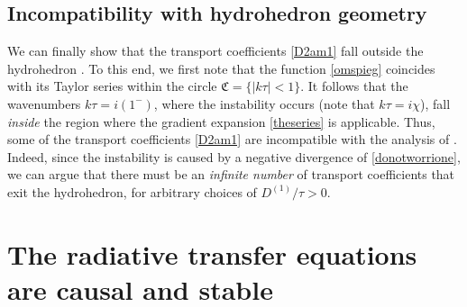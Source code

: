 \documentclass[a4paper, amsfonts, amssymb, amsmath, reprint, showkeys, nofootinbib, twoside,notitlepage,onecolumn]{revtex4-2}
\theoremstyle{definition}
\theoremstyle{theorem}
\theoremstyle{corollary}
\begin{document}



\subsection{Incompatibility with hydrohedron geometry}

We can finally show that the transport coefficients \eqref{D2am1} fall outside the hydrohedron \cite{HellerHydroHedron2023jtd}. To this end, we first note that the function \eqref{omspieg} coincides with its Taylor series within the circle $\mathfrak{C}=\{|k\tau|<1 \}$. It follows that the wavenumbers $k\tau= i(1^-)$, where the instability occurs (note that $k\tau=i\chi$), fall \textit{inside} the region where the gradient expansion \eqref{theseries} is applicable. Thus, some of the transport coefficients \eqref{D2am1} are incompatible with the analysis of \cite{HellerHydroHedron2023jtd}. Indeed, since the instability is caused by a negative divergence of \eqref{donotworrione}, we can argue that there must be an \textit{infinite number} of transport coefficients that exit the hydrohedron, for arbitrary choices of $D^{(1)}/\tau>0$.

\vspace{-0.2cm}
\section{The radiative transfer equations are causal and stable}
\vspace{-0.2cm}
\end{document}
